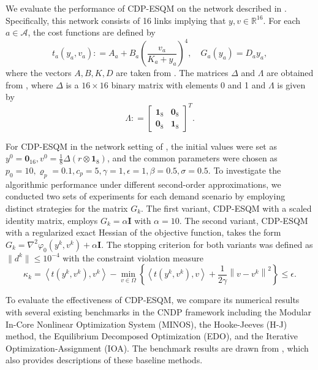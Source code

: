 \documentclass[11pt,a4paper]{article}
\theoremstyle{plain}
\begin{document}
We evaluate the performance of CDP-ESQM on the network described in {\cite[Figure 3 and Table VI]{suwansirikul1987edo}}. Specifically, this network consists of 16 links implying that \( y, v \in \mathbb{R}^{16} \). For each \( a \in \mathcal{A} \), the cost functions are defined by
\begin{equation} t_a(y_a,v_a): = A_a + B_a \left(\frac{v_a}{K_a + y_a}\right)^4, \quad G_a(y_a) = D_a y_a,
\end{equation}
where the vectors \( A, B, K, D \) are taken from {\cite[Table VI]{suwansirikul1987edo}}. The matrices \( \Delta \) and \( \Lambda \) are obtained from {\cite[Figure~3]{suwansirikul1987edo}}, where \( \Delta \) is a \( 16 \times 16 \) binary matrix with elements 0 and 1 and \( \Lambda \) is given by
\begin{equation}
\Lambda: = 
\begin{bmatrix}
\mathbf{1}_8  & \mathbf{0}_8\\
\mathbf{0}_8  & \mathbf{1}_8
\end{bmatrix}^T.
\end{equation}



For CDP-ESQM in the network setting of {\cite[Figure~3 and Table~VI]{suwansirikul1987edo}}, the initial values were set as $y^0 = \mathbf{0}_{16}, v^0 = \frac{1}{8}\Delta(r \otimes \mathbf{1}_8 )$, and the common parameters were chosen as {$p_0=10, \varrho_p=0.1, c_p=5, \gamma=1, \epsilon =1, \beta =0.5,\sigma=0.5$}. {To investigate the algorithmic performance under different second-order approximations, we conducted two sets of experiments for each demand scenario by employing distinct strategies for the matrix $G_k$. The first variant, CDP-ESQM with a scaled identity matrix, employs  $G_k = \alpha \mathbf{I}$ with $\alpha = 10$. The second variant, CDP-ESQM with a regularized exact Hessian of the objective function, takes the form $G_k = \nabla^2 \varphi_0(y^k,v^k) + \alpha \mathbf{I}$.} The stopping criterion for both variants was defined as $\|d^k\|\leq {10^{-4}}$ with the constraint violation measure
\begin{equation}
\kappa_k=\left\langle t(y^k,v^k),v^k\right\rangle-\min\limits_{v\in\Omega}\left\{\left\langle t(y^k,v^k),v\right\rangle+\frac{1}{2\gamma}\left\|v-v^k\right\|^2\right\}\leq {\epsilon}.
\end{equation}


To evaluate the effectiveness of CDP-ESQM, we compare its numerical results with several existing benchmarks in the CNDP framework including the Modular In-Core Nonlinear Optimization System (MINOS), the Hooke-Jeeves (H-J) method, the Equilibrium Decomposed Optimization (EDO), and the Iterative Optimization-Assignment (IOA). The benchmark results are drawn from \cite[Table VII]{suwansirikul1987edo}, which also provides descriptions of these baseline methods.
\end{document}
